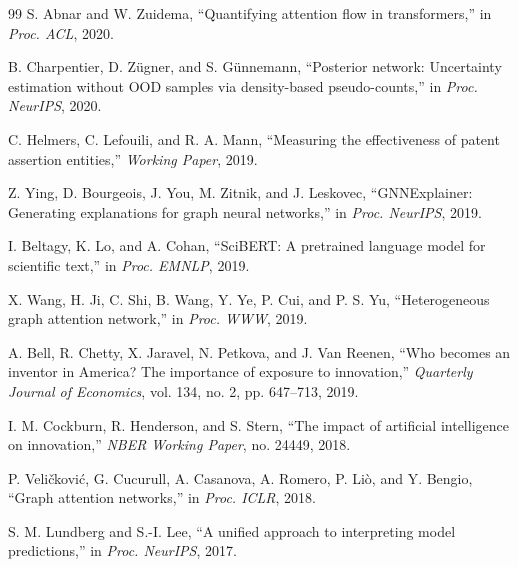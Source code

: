 \documentclass[journal]{IEEEtran}
\begin{document}
\begin{thebibliography}{99}
S. Abnar and W. Zuidema, ``Quantifying attention flow in transformers,'' in \textit{Proc. ACL}, 2020.

B. Charpentier, D. Zügner, and S. Günnemann, ``Posterior network: Uncertainty estimation without OOD samples via density-based pseudo-counts,'' in \textit{Proc. NeurIPS}, 2020.

C. Helmers, C. Lefouili, and R. A. Mann, ``Measuring the effectiveness of patent assertion entities,'' \textit{Working Paper}, 2019.

Z. Ying, D. Bourgeois, J. You, M. Zitnik, and J. Leskovec, ``GNNExplainer: Generating explanations for graph neural networks,'' in \textit{Proc. NeurIPS}, 2019.

I. Beltagy, K. Lo, and A. Cohan, ``SciBERT: A pretrained language model for scientific text,'' in \textit{Proc. EMNLP}, 2019.

X. Wang, H. Ji, C. Shi, B. Wang, Y. Ye, P. Cui, and P. S. Yu, ``Heterogeneous graph attention network,'' in \textit{Proc. WWW}, 2019.

A. Bell, R. Chetty, X. Jaravel, N. Petkova, and J. Van Reenen, ``Who becomes an inventor in America? The importance of exposure to innovation,'' \textit{Quarterly Journal of Economics}, vol. 134, no. 2, pp. 647--713, 2019.

I. M. Cockburn, R. Henderson, and S. Stern, ``The impact of artificial intelligence on innovation,'' \textit{NBER Working Paper}, no. 24449, 2018.

P. Veličković, G. Cucurull, A. Casanova, A. Romero, P. Liò, and Y. Bengio, ``Graph attention networks,'' in \textit{Proc. ICLR}, 2018.

S. M. Lundberg and S.-I. Lee, ``A unified approach to interpreting model predictions,'' in \textit{Proc. NeurIPS}, 2017.

\end{thebibliography}
\end{document}
